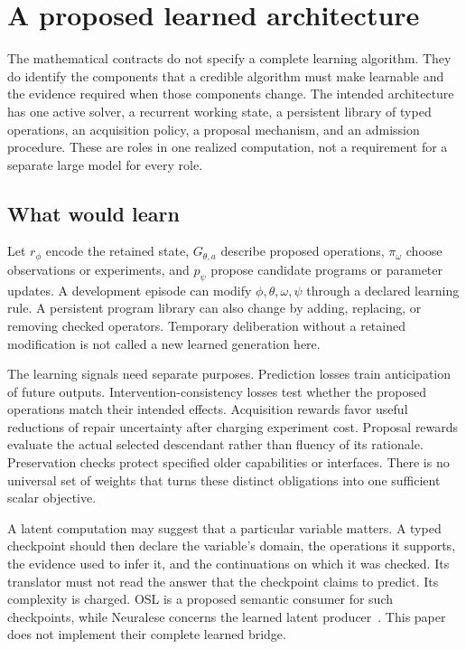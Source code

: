 \section{A proposed learned architecture}\label{SII:sec:architecture}
The mathematical contracts do not specify a complete learning algorithm. They do identify the components that a credible algorithm must make learnable and the evidence required when those components change. The intended architecture has one active solver, a recurrent working state, a persistent library of typed operations, an acquisition policy, a proposal mechanism, and an admission procedure. These are roles in one realized computation, not a requirement for a separate large model for every role.

\subsection{What would learn}
Let $r_\phi$ encode the retained state, $G_{\theta,a}$ describe proposed operations, $\pi_\omega$ choose observations or experiments, and $p_\psi$ propose candidate programs or parameter updates. A development episode can modify $\phi,\theta,\omega,\psi$ through a declared learning rule. A persistent program library can also change by adding, replacing, or removing checked operators. Temporary deliberation without a retained modification is not called a new learned generation here.

The learning signals need separate purposes. Prediction losses train anticipation of future outputs. Intervention-consistency losses test whether the proposed operations match their intended effects. Acquisition rewards favor useful reductions of repair uncertainty after charging experiment cost. Proposal rewards evaluate the actual selected descendant rather than fluency of its rationale. Preservation checks protect specified older capabilities or interfaces. There is no universal set of weights that turns these distinct obligations into one sufficient scalar objective.

A latent computation may suggest that a particular variable matters. A typed checkpoint should then declare the variable's domain, the operations it supports, the evidence used to infer it, and the continuations on which it was checked. Its translator must not read the answer that the checkpoint claims to predict. Its complexity is charged. OSL is a proposed semantic consumer for such checkpoints, while Neuralese concerns the learned latent producer~\cite{SII:osl,SII:neuralese}. This paper does not implement their complete learned bridge.

